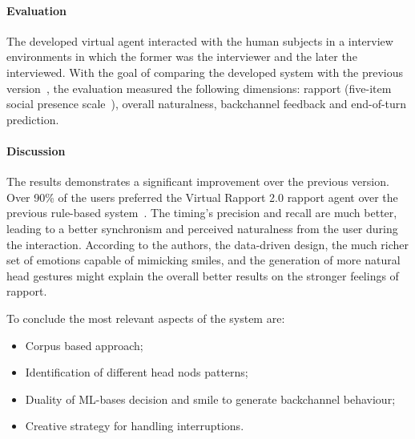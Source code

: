 
\paragraph{\textbf{Evaluation}}
The developed virtual agent interacted with the human subjects in a interview environments in which the former was the interviewer and the later the interviewed. With the goal of comparing the developed system with the previous version~\cite{Gratch2006}, the evaluation measured the following dimensions: rapport (five-item social presence scale~\cite{Bailenson2001}), overall naturalness, backchannel feedback and end-of-turn prediction.



\paragraph{\textbf{Discussion}}
The results demonstrates a significant improvement over the previous version. Over 90\% of the users preferred the Virtual Rapport 2.0 rapport agent over the previous rule-based system~\cite{Gratch2006, Morency2008}. The timing's precision and recall are much better, leading to a better synchronism and perceived naturalness from the user during the interaction. According to the authors, the data-driven design, the much richer set of emotions capable of mimicking smiles, and the generation of more natural head gestures might explain the overall better results on the stronger feelings of rapport.

To conclude the most relevant aspects of the system are:
\begin{itemize}
	\item Corpus based approach;
	\item Identification of different head nods patterns;
	\item Duality of \ac{ML}-bases decision and smile to generate backchannel behaviour;
	\item Creative strategy for handling interruptions.
\end{itemize}